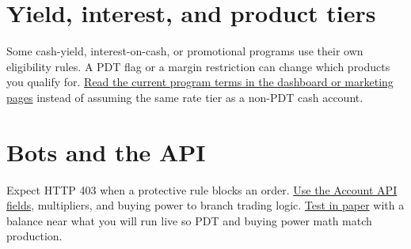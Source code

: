 \documentclass{article}
\begin{document}
\section{Yield, interest, and product tiers}
Some cash-yield, interest-on-cash, or promotional programs use their own eligibility rules. A PDT flag or a margin restriction can change which products you qualify for. \uline{Read the current program terms in the dashboard or marketing pages} instead of assuming the same rate tier as a non-PDT cash account.

\section{Bots and the API}
Expect HTTP 403 when a protective rule blocks an order. 
\uline{Use the Account API fields}, multipliers, and buying power to branch trading logic. \uline{Test in paper} with a balance near what you will run live so PDT and buying power math match production.
\end{document}

